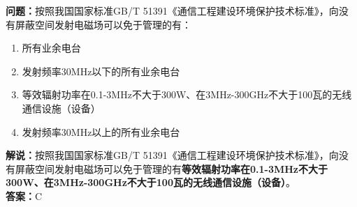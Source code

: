 \documentclass{ctexbook}
\begin{document}
\bigskip


\noindent\textbf{问题：}按照我国国家标准GB/T 51391《通信工程建设环境保护技术标准》，向没有屏蔽空间发射电磁场可以免于管理的有： 
\begin{enumerate}[label=\Alph*), leftmargin=3em]
	\item 所有业余电台
	\item 发射频率30MHz以下的所有业余电台
	\item 等效辐射功率在0.1-3MHz不大于300W、在3MHz-300GHz不大于100瓦的无线通信设施（设备）
	\item 发射频率30MHz以上的所有业余电台
\end{enumerate}
\noindent\textbf{解说：}按照我国国家标准GB/T 51391《通信工程建设环境保护技术标准》，向没有屏蔽空间发射电磁场可以免于管理的有\textbf{等效辐射功率在0.1-3MHz不大于300W、在3MHz-300GHz不大于100瓦的无线通信设施（设备）}。\\\textbf{答案：}C


\bigskip


%


%
\end{document}
